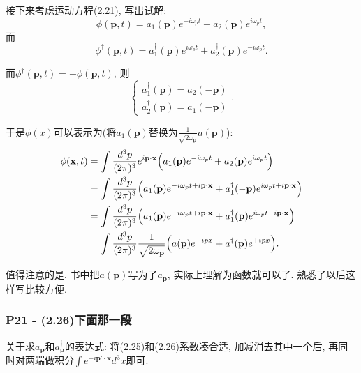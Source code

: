 \documentclass[cn,hazy,blue,11pt,device=normal,chinesefont=founder]{elegantnote}
\begin{document}
接下来考虑运动方程(2.21), 写出试解: 
\begin{equation}
  \phi(\mathbf{p}, t) = a_1(\mathbf{p})e^{-i\omega_p t} + a_2(\mathbf{p})e^{i\omega_p t}, 
\end{equation}
而
\begin{equation}
  \phi^{\dagger}(\mathbf{p}, t) = a_1^{\dagger}(\mathbf{p})e^{i\omega_p t} + a_2^{\dagger}(\mathbf{p})e^{-i\omega_p t}. 
\end{equation}

而$\phi^{\dagger}(\mathbf{p}, t) = -\phi(\mathbf{p}, t)$, 则
\begin{equation}
  \left\{\begin{array}{c} a_1^{\dagger}(\mathbf{p}) = a_2(\mathbf{-p})\\ a_2^{\dagger}(\mathbf{p}) = a_1(\mathbf{-p})\end{array}\right..
\end{equation}

于是$\phi(x)$可以表示为(将$a_1(\mathbf{p})$替换为$\frac{1}{\sqrt{2\omega_\mathbf{p}}} a(\mathbf{p})$): 
\begin{equation}
  \begin{aligned}
  \phi(\mathbf{x}, t) &= \int \frac{d^3 p}{(2\pi)^3}e^{i\mathbf{p \cdot x}}\Bigl(a_1(\mathbf{p})e^{-i\omega_p t} + a_2(\mathbf{p})e^{i\omega_p t}\Bigr) \\
  &= \int \frac{d^3 p}{(2\pi)^3}\Bigl(a_1(\mathbf{p})e^{-i\omega_p t +i\mathbf{p \cdot x}} + a_1^{\dagger}(-\mathbf{p})e^{i\omega_p t+i\mathbf{p \cdot x}}\Bigr) \\
  &= \int \frac{d^3 p}{(2\pi)^3}\Bigl(a_1(\mathbf{p})e^{-i\omega_p t + i\mathbf{p \cdot x}} + a_1^{\dagger}(\mathbf{p})e^{i\omega_p t - i\mathbf{p \cdot x}}\Bigr) \\
  &= \int \frac{d^3 p}{(2\pi)^3} \frac{1}{\sqrt{2 \omega_\mathbf{p}}} \Bigl(a(\mathbf{p})e^{-ipx} + a^{\dagger}(\mathbf{p})e^{+ipx}\Bigr). 
  \end{aligned}
\end{equation}

值得注意的是, 书中把$a(\mathbf{p})$写为了$a_\mathbf{p}$, 实际上理解为函数就可以了. 熟悉了以后这样写比较方便. 

\subsubsection{P21 - (2.26)下面那一段}

关于求$a_\mathbf{p}$和$a^{\dagger}_\mathbf{p}$的表达式: 将(2.25)和(2.26)系数凑合适, 加减消去其中一个后, 再同时对两端做积分$\int e^{-i\mathbf{p'\cdot x}} d^3 x$即可. 
\end{document}
